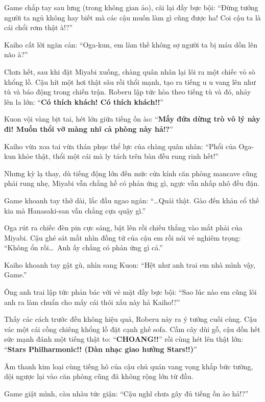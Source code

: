 \documentclass[../main.tex]{subfiles}
\begin{document}

Game chắp tay sau lưng (trong không gian ảo), cãi lại đầy bực bội: ``Đừng tưởng người ta ngủ không hay biết mà các cậu muốn làm gì cũng được ha! Coi cậu ta là cái chổi rơm thật à!?''

Kaiho cất lời ngăn cản: ``Oga-kun, em làm thế không sợ người ta bị máu dồn lên não à?''

Chưa hết, sau khi đặt Miyabi xuống, chàng quân nhân lại lôi ra một chiếc vỏ sò khổng lồ. Cậu hít một hơi thật sâu rồi thổi mạnh, tạo ra tiếng u u vang lên như tù và báo động trong chiến trận. Roberu lập tức hòa theo tiếng tù và đó, nhảy lên la lớn: ``\textbf{Có thích khách! Có thích khách!!}''


Kuon vội vàng bịt tai, hét lớn giữa tiếng ồn ào: ``\textbf{Mấy đứa dừng trò vô lý này đi! Muốn thổi vỡ màng nhĩ cả phòng này hả!?}''

Kaiho vừa xoa tai vừa thán phục thể lực của chàng quân nhân: ``Phổi của Oga-kun khỏe thật, thổi một cái mà ly tách trên bàn đều rung rinh hết!''

Nhưng kỳ lạ thay, dù tiếng động lớn đến mức cửa kính căn phòng mancave cũng phải rung nhẹ, Miyabi vẫn chẳng hề có phản ứng gì, ngực vẫn nhấp nhô đều đặn.

Game khoanh tay thở dài, lắc đầu ngao ngán: ``\dots Quái thật. Gào đến khản cổ thế kia mà Hanasaki-san vẫn chẳng cựa quậy gì.''

Oga rút ra chiếc đèn pin cực sáng, bật lên rồi chiếu thẳng vào mắt phải của Miyabi. Cậu ghé sát mắt nhìn đồng tử của cậu em rồi nói vẻ nghiêm trọng: ``Không ổn rồi\dots\ Anh ấy chẳng có phản ứng gì cả.''

Kaiho khoanh tay gật gù, nhìn sang Kuon: ``Hệt như anh trai em nhà mình vậy, Game.''

Ông anh trai lập tức phản bác với vẻ mặt đầy bực bội: ``Sao lúc nào em cũng lôi anh ra làm chuẩn cho mấy cái thói xấu này hả Kaiho!?''

Thấy các cách trước đều không hiệu quả, Roberu nảy ra ý tưởng cuối cùng. Cậu vác một cái cồng chiêng khổng lồ đặt cạnh ghế sofa. Cầm cây dùi gỗ, cậu dồn hết sức mạnh đánh một tiếng thật to: ``\textbf{CHOANG!!}'' rồi cùng hét lên thật lớn: ``\textbf{Stars Philharmonic!! (Dàn nhạc giao hưởng Stars!!)}''

Âm thanh kim loại cùng tiếng hô của cậu chủ quán vang vọng khắp bức tường, dội ngược lại vào căn phòng cũng đã không rộng lớn từ đầu.

Game giật mình, càu nhàu tức giận: ``Cậu nghĩ chưa gây đủ tiếng ồn ào hả!?''
\end{document}
